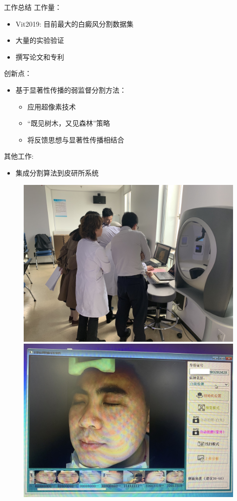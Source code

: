 \begin{frame}{工作总结}
工作量：
\begin{itemize}
\item Vit2019: 目前最大的白癜风分割数据集
\item 大量的实验验证
\item 撰写论文和专利
\end{itemize}

\vspace{0.1cm}

创新点：
\begin{itemize}
\item 基于显著性传播的弱监督分割方法：
\begin{itemize}
\item 应用超像素技术
\item ``既见树木，又见森林''策略
\item 将反馈思想与显著性传播相结合
\end{itemize}
\end{itemize}

\vspace{0.1cm}

其他工作:
\begin{itemize}
\item 集成分割算法到皮研所系统
\end{itemize}

\vspace{-0.2cm}

\begin{figure}
    \includegraphics[width=.26\linewidth]{figures/presentation2.jpg}
    \hspace{0.05cm}
    \includegraphics[width=.26\linewidth]{figures/presentation1.jpg}
\end{figure}
\end{frame}


